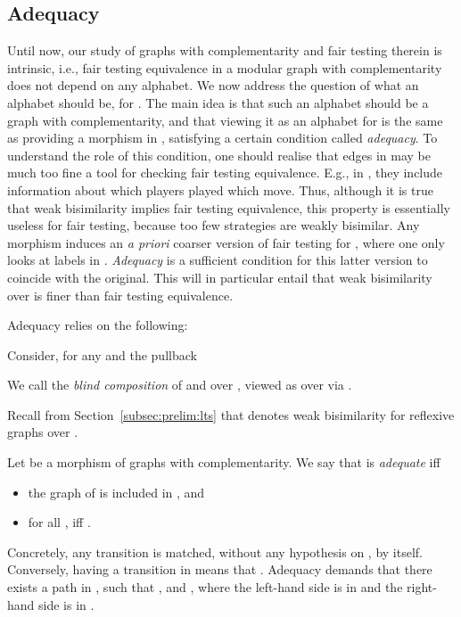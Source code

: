 \documentclass{LMCS}
\theoremstyle{plain}\newtheorem{satz}[thm]{Satz}
\begin{document}
\subsection{Adequacy}
Until now, our study of graphs with complementarity and fair testing
therein is intrinsic, i.e., fair testing equivalence in a modular
graph with complementarity  does not depend on any alphabet.  We
now address the question of what an alphabet should be, for . The
main idea is that such an alphabet  should be a graph with
complementarity, and that viewing it as an alphabet for  is the
same as providing a morphism  in , satisfying
a certain condition called \emph{adequacy}. To understand the role of
this condition, one should realise that edges in  may be much too
fine a tool for checking fair testing equivalence. E.g., in ,
they include information about which players played which move.  Thus,
although it is true that weak bisimilarity implies fair testing
equivalence, this property is essentially useless for fair testing,
because too few strategies are weakly bisimilar.  Any morphism  induces an \emph{a priori} coarser version of fair
testing for , where one only looks at labels in .
\emph{Adequacy} is a sufficient condition for this latter version to
coincide with the original. This will in particular entail that weak
bisimilarity over  is finer than fair testing equivalence.

Adequacy relies on the following:
\begin{defi}
  Consider, for any  and  the pullback
    \begin{center}
    \end{center}
    We call  the \emph{blind composition} of  and
     over , viewed as \anlts{} over  via
    .
\end{defi}

Recall from Section~\ref{subsec:prelim:lts} that  denotes
weak bisimilarity for reflexive graphs over .
\begin{defi}
  Let  be a morphism of graphs with
  complementarity. We say that  is \emph{adequate} iff
  \begin{itemize}
  \item the graph of  is
    included in , and
  \item for all ,  iff .
  \end{itemize}

\end{defi}
Concretely, any transition  is matched, without
any hypothesis on , by  itself. Conversely, having a
transition  in 
means that . Adequacy demands that
there exists a path  in , such that , and , where the left-hand side is in  and the
right-hand side is in .
\end{document}
